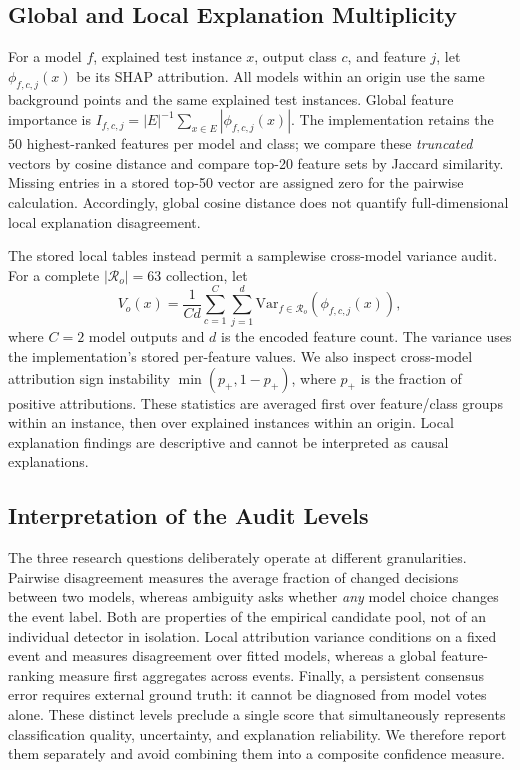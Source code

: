 \documentclass[10pt,conference]{IEEEtran}
\newcommand{\R}{\mathcal{R}}
\begin{document}
\subsection{Global and Local Explanation Multiplicity}
For a model $f$, explained test instance $x$, output class $c$, and feature $j$, let $\phi_{f,c,j}(x)$ be its SHAP attribution. All models within an origin use the same background points and the same explained test instances. Global feature importance is $I_{f,c,j}=|E|^{-1}\sum_{x\in E}|\phi_{f,c,j}(x)|$. The implementation retains the 50 highest-ranked features per model and class; we compare these \emph{truncated} vectors by cosine distance and compare top-20 feature sets by Jaccard similarity. Missing entries in a stored top-50 vector are assigned zero for the pairwise calculation. Accordingly, global cosine distance does not quantify full-dimensional local explanation disagreement.

The stored local tables instead permit a samplewise cross-model variance audit. For a complete $|\R_o|=63$ collection, let
\begin{equation}
 V_o(x)=\frac{1}{Cd}\sum_{c=1}^{C}\sum_{j=1}^{d}
 \mathrm{Var}_{f\in\R_o}(\phi_{f,c,j}(x)),
 \label{eq:local}
\end{equation}
where $C=2$ model outputs and $d$ is the encoded feature count. The variance uses the implementation's stored per-feature values. We also inspect cross-model attribution sign instability $\min(p_+,1-p_+)$, where $p_+$ is the fraction of positive attributions. These statistics are averaged first over feature/class groups within an instance, then over explained instances within an origin. Local explanation findings are descriptive and cannot be interpreted as causal explanations.

\subsection{Interpretation of the Audit Levels}
The three research questions deliberately operate at different granularities. Pairwise disagreement measures the average fraction of changed decisions between two models, whereas ambiguity asks whether \emph{any} model choice changes the event label. Both are properties of the empirical candidate pool, not of an individual detector in isolation. Local attribution variance conditions on a fixed event and measures disagreement over fitted models, whereas a global feature-ranking measure first aggregates across events. Finally, a persistent consensus error requires external ground truth: it cannot be diagnosed from model votes alone. These distinct levels preclude a single score that simultaneously represents classification quality, uncertainty, and explanation reliability. We therefore report them separately and avoid combining them into a composite confidence measure.
\end{document}
